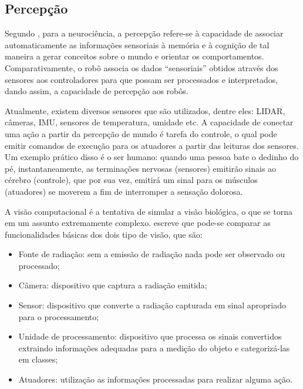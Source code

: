 \subsection{Percepção}\label{sec:perception}
Segundo \cite{lent}, para a neurociência, a percepção refere-se à capacidade de associar automaticamente as informações sensoriais à memória e à cognição de tal maneira a gerar conceitos sobre o mundo e orientar os comportamentos. Comparativamente, o robô associa os dados “sensoriais” obtidos através dos sensores aos controladores para que possam ser processados e interpretados, dando assim, a capacidade de percepção aos robôs. 

Atualmente, existem diversos sensores que são utilizados, dentre eles: LIDAR, câmeras, IMU, sensores de temperatura, umidade etc. A capacidade de conectar uma ação a partir da percepção de mundo é tarefa do controle, o qual pode emitir comandos de execução para os atuadores a partir das leituras dos sensores. Um exemplo prático disso é o ser humano: quando uma pessoa bate o dedinho do pé, instantaneamente, as terminações nervosas (sensores) emitirão sinais ao cérebro (controle), que por sua vez, emitirá um sinal para os músculos (atuadores) se moverem a fim de interromper a sensação dolorosa.    

A visão computacional é a tentativa de simular a visão biológica, o que se torna em um assunto extremamente complexo. \cite{jahne} escreve que pode-se comparar as funcionalidades básicas dos dois tipo de visão, que são:

\begin{itemize}
	\item Fonte de radiação: sem a emissão de radiação nada pode ser observado ou processado;
	
	\item Câmera: dispositivo que captura a radiação emitida;
	
	\item Sensor: dispositivo que converte a radiação capturada em sinal apropriado para o processamento;
	
    \item Unidade de processamento: dispositivo que processa os sinais convertidos extraindo informações adequadas para a medição do objeto e categorizá-las em classes;
    \item Atuadores: utilização as informações processadas para realizar alguma ação.
    
\end{itemize}

